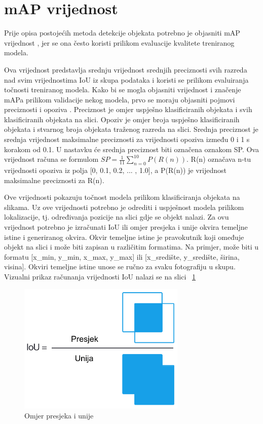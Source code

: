 \section{mAP vrijednost}

Prije opisa postojećih metoda detekcije objekata potrebno je objasniti mAP vrijednost , jer se ona često koristi prilikom evaluacije
kvalitete treniranog modela.

Ova vrijednost predstavlja srednju vrijednost srednjih preciznosti svih razreda nad svim
vrijednostima IoU iz skupa podataka i koristi se prilikom evaluiranja točnosti treniranog modela. 
Kako bi se mogla objasniti vrijednost i značenje mAPa prilikom validacije nekog modela, prvo se moraju objasniti pojmovi
preciznosti  i opoziva . Preciznost je omjer uspješno klasificiranih objekata i svih klasificiranih objekata na slici. 
Opoziv je omjer broja uspješno klasificiranih objekata i stvarnog broja objekata traženog razreda na slici. 
Srednja preciznost  je srednja vrijednost maksimalne preciznosti za vrijednosti opoziva između 0 i 1 s korakom 
od 0.1. U nastavku će srednja preciznost biti označena oznakom SP. \newline 
Ova vrijednost računa se formulom  $SP=\frac{1}{11}\sum_{n=0}^{10} P(R(n))$. R(n) označava n-tu vrijednosti opoziva iz polja [0, 0.1, 0.2, ... , 1.0], a 
P(R(n)) je vrijednost maksimalne preciznosti za R(n). \citep{everingham2010pascal}

Ove vrijednosti pokazuju točnost modela prilikom klasificiranja objekata na slikama. Uz ove vrijednosti potrebno je odrediti i uspješnost modela prilikom lokalizacije, tj. 
određivanja pozicije na slici gdje se objekt nalazi. Za ovu vrijednost potrebno je izračunati IoU  ili omjer presjeka i unije okvira temeljne istine i 
generiranog okvira. Okvir temeljne istine je pravokutnik koji omeđuje objekt na slici i može biti zapisan u različitim formatima. Na primjer, može biti u formatu 
[x\_min, y\_min, x\_max, y\_max] ili [x\_središte, y\_središte, širina, visina]. Okviri temeljne istine unose se ručno za svaku fotografiju u skupu.
Vizualni prikaz računanja vrijednosti IoU nalazi se na slici ~\ref{IoU}

\begin{figure}[htb]
    \centering
    \includegraphics[width=8cm]{img/iou_equation.png}
    \caption{Omjer presjeka i unije}
    \label{IoU}
\end{figure}


